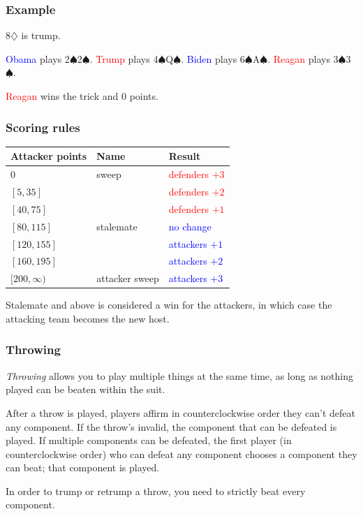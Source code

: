 \documentclass{beamer}
\renewcommand{\d}{$\diamondsuit$}
\newcommand{\s}{$\spadesuit$}
\begin{document}
\begin{frame}
	\frametitle{Example}
	8\d{} is trump.
	\begin{itemize}
		\ii \textcolor{blue}{Obama} plays 2\s2\s.
		\ii \textcolor{red}{Trump} plays 4\s Q\s.
		\ii \textcolor{blue}{Biden} plays 6\s A\s.
		\ii \textcolor{red}{Reagan} plays 3\s3\s.
	\end{itemize}
	\textcolor{red}{Reagan} wins the trick and $0$ points.
	
\end{frame}

\begin{frame}
	\frametitle{Scoring rules}
	\begin{table}
		\begin{tabular}{lll}
			\hline
			Attacker points & Name           & Result                           \\ \hline
			$0$             & sweep          & \textcolor{red}{defenders $+3$}  \\
			$[5,35]$        &                & \textcolor{red}{defenders $+2$}  \\
			$[40,75]$       &                & \textcolor{red}{defenders $+1$}  \\ \hline
			$[80,115]$      & stalemate      & \textcolor{blue}{no change}      \\
			$[120,155]$     &                & \textcolor{blue}{attackers $+1$} \\
			$[160,195]$     &                & \textcolor{blue}{attackers $+2$} \\
			$[200,\infty)$  & attacker sweep & \textcolor{blue}{attackers $+3$} \\
		\end{tabular}
	\end{table}
	Stalemate and above is considered a win for the attackers, in which case the attacking team becomes the new host.
\end{frame}

\begin{frame}
	\frametitle{Throwing}
	\emph{Throwing} allows you to play multiple things at the same time, as long as nothing played can be beaten within the suit.

	\medskip

	After a throw is played, players affirm in counterclockwise order they can't defeat any component. If the throw's invalid, the component that can be defeated is played. If multiple components can be defeated, the first player (in counterclockwise order) who can defeat any component chooses a component they can beat; that component is played.

	\medskip

	In order to trump or retrump a throw, you need to strictly beat every component.

\end{frame}
\end{document}
